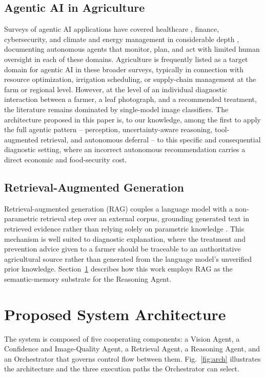 \documentclass[conference]{IEEEtran}
\begin{document}
\subsection{Agentic AI in Agriculture}
Surveys of agentic AI applications have covered healthcare \cite{b11,b1}, finance, cybersecurity, and climate and energy management in considerable depth \cite{b2,b6,b13}, documenting autonomous agents that monitor, plan, and act with limited human oversight in each of these domains. Agriculture is frequently listed as a target domain for agentic AI in these broader surveys, typically in connection with resource optimization, irrigation scheduling, or supply-chain management at the farm or regional level. However, at the level of an individual diagnostic interaction between a farmer, a leaf photograph, and a recommended treatment, the literature remains dominated by single-model image classifiers. The architecture proposed in this paper is, to our knowledge, among the first to apply the full agentic pattern -- perception, uncertainty-aware reasoning, tool-augmented retrieval, and autonomous deferral -- to this specific and consequential diagnostic setting, where an incorrect autonomous recommendation carries a direct economic and food-security cost.

\subsection{Retrieval-Augmented Generation}
Retrieval-augmented generation (RAG) couples a language model with a non-parametric retrieval step over an external corpus, grounding generated text in retrieved evidence rather than relying solely on parametric knowledge \cite{r_lewis2020}. This mechanism is well suited to diagnostic explanation, where the treatment and prevention advice given to a farmer should be traceable to an authoritative agricultural source rather than generated from the language model's unverified prior knowledge. Section~\ref{sec:arch} describes how this work employs RAG as the semantic-memory substrate for the Reasoning Agent.

\section{Proposed System Architecture}
\label{sec:arch}

The system is composed of five cooperating components: a Vision Agent, a Confidence and Image-Quality Agent, a Retrieval Agent, a Reasoning Agent, and an Orchestrator that governs control flow between them. Fig.~\ref{fig:arch} illustrates the architecture and the three execution paths the Orchestrator can select.
\end{document}
